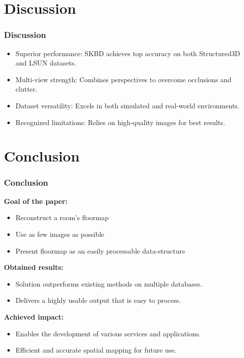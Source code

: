 \documentclass{beamer}
\begin{document}
\section{Discussion}
\begin{frame}
\frametitle{Discussion}
\begin{itemize}
    \item Superior performance: SKBD achieves top accuracy on both Structured3D and LSUN datasets.
    \item Multi-view strength: Combines perspectives to overcome occlusions and clutter.
    \item Dataset versatility: Excels in both simulated and real-world environments.
    \item Recognized limitations: Relies on high-quality images for best results.
\end{itemize}
\end{frame}

\section{Conclusion}
\begin{frame}
\frametitle{Conclusion}
\textbf{Goal of the paper:}
\begin{itemize}
    \item Reconstruct a room's floormap
    \item Use as few images as possible
    \item Present floormap as an easily processable data-structure
\end{itemize}
\textbf{Obtained results:}
\begin{itemize}
    \item Solution outperforms existing methods on multiple databases.
    \item Delivers a highly usable output that is easy to process.
\end{itemize}
\textbf{Achieved impact:}
\begin{itemize}
    \item Enables the development of various services and applications.
    \item Efficient and accurate spatial mapping for future use.
\end{itemize}
\end{frame}
\end{document}
